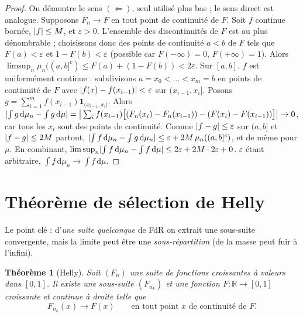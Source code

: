 \documentclass[11pt]{article}
\newcommand{\R}{\mathbb{R}}
\newcommand{\dd}{\,\mathrm{d}}
\DeclarePairedDelimiter{\abs}{\lvert}{\rvert}
\theoremstyle{plain}
\newtheorem{theoreme}{Théorème}
\theoremstyle{definition}
\theoremstyle{remark}
\begin{document}
\begin{proof}
On démontre le sens $(\Leftarrow)$, seul utilisé plus bas ; le sens direct est analogue.
Supposons $F_n\to F$ en tout point de continuité de $F$. Soit $f$ continue bornée, $\abs f\le M$, et
$\varepsilon>0$. L'ensemble des discontinuités de $F$ est au plus dénombrable ; choisissons donc des
points de continuité $a<b$ de $F$ tels que $F(a)<\varepsilon$ et $1-F(b)<\varepsilon$ (possible car
$F(-\infty)=0$, $F(+\infty)=1$). Alors $\limsup_n\mu_n((a,b]^c)\le F(a)+(1-F(b))<2\varepsilon$.
Sur $[a,b]$, $f$ est uniformément continue : subdivisons $a=x_0<\dots<x_m=b$ en points de continuité
de $F$ avec $\abs{f(x)-f(x_{i-1})}<\varepsilon$ sur $(x_{i-1},x_i]$. Posons
$g=\sum_{i=1}^m f(x_{i-1})\mathbf 1_{(x_{i-1},x_i]}$. Alors $\abs{\int g\dd\mu_n-\int g\dd\mu}
=\big|\sum_i f(x_{i-1})\big[(F_n(x_i)-F_n(x_{i-1}))-(F(x_i)-F(x_{i-1}))\big]\big|\to0$,
car tous les $x_i$ sont des points de continuité. Comme $\abs{f-g}\le\varepsilon$ sur $(a,b]$ et
$\abs{f-g}\le 2M$ partout,
$\abs{\int f\dd\mu_n-\int g\dd\mu_n}\le\varepsilon+2M\,\mu_n((a,b]^c)$, et de même pour $\mu$.
En combinant, $\limsup_n\abs{\int f\dd\mu_n-\int f\dd\mu}\le 2\varepsilon+2M\cdot 2\varepsilon+0$.
$\varepsilon$ étant arbitraire, $\int f\dd\mu_n\to\int f\dd\mu$.
\end{proof}

\section{Théorème de sélection de Helly}

Le point clé : d'\emph{une suite quelconque} de FdR on extrait une sous-suite convergente, mais la
limite peut être une \emph{sous-répartition} (de la masse peut fuir à l'infini).

\begin{theoreme}[Helly]\label{th:helly}
Soit $(F_n)$ une suite de fonctions croissantes à valeurs dans $[0,1]$. Il existe une sous-suite
$(F_{n_k})$ et une fonction $F:\R\to[0,1]$ \emph{croissante et continue à droite} telle que
\[
F_{n_k}(x)\longrightarrow F(x)\qquad\text{en tout point $x$ de continuité de $F$.}
\]
\end{theoreme}
\end{document}
